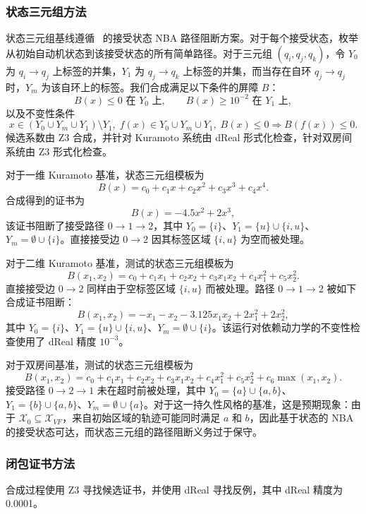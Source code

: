 \subsubsection{状态三元组方法}
状态三元组基线遵循~\cite{wongpiromsarn2015automata} 的接受状态 NBA 路径阻断方案。对于每个接受状态，枚举从初始自动机状态到该接受状态的所有简单路径。对于三元组 $(q_i,q_j,q_k)$，令 $Y_0$ 为 $q_i\rightarrow q_j$ 上标签的并集，$Y_1$ 为 $q_j\rightarrow q_k$ 上标签的并集，而当存在自环 $q_j\rightarrow q_j$ 时，$Y_m$ 为该自环上的标签。我们合成满足以下条件的屏障 $B$：
\[
B(x)\le 0 \text{ 在 } Y_0\text{ 上},\qquad
B(x)\ge 10^{-2} \text{ 在 } Y_1\text{ 上},
\]
以及不变性条件
\[
x\in (Y_0\cup Y_m\cup Y_1)\setminus Y_1,\; f(x)\in Y_0\cup Y_m\cup Y_1,\; B(x)\le 0
\Rightarrow B(f(x))\le 0.
\]
候选系数由 Z3 合成，并针对 Kuramoto 系统由 dReal 形式化检查，针对双房间系统由 Z3 形式化检查。

对于一维 Kuramoto 基准，状态三元组模板为
\[
B(x)=c_0+c_1x+c_2x^2+c_3x^3+c_4x^4.
\]
合成得到的证书为
\[
B(x)=-4.5x^2+2x^3,
\]
该证书阻断了接受路径 $0\rightarrow1\rightarrow2$，其中 $Y_0=\{i\}$、$Y_1=\{u\}\cup\{i,u\}$、$Y_m=\emptyset\cup\{i\}$。直接接受边 $0\rightarrow2$ 因其标签区域 $\{i,u\}$ 为空而被处理。

对于二维 Kuramoto 基准，测试的状态三元组模板为
\[
B(x_1,x_2)=c_0+c_1x_1+c_2x_2+c_3x_1x_2+c_4x_1^2+c_5x_2^2.
\]
直接接受边 $0\rightarrow2$ 同样由于空标签区域 $\{i,u\}$ 而被处理。路径 $0\rightarrow1\rightarrow2$ 被如下合成证书阻断：
\[
B(x_1,x_2)=-x_1-x_2-3.125x_1x_2+2x_1^2+2x_2^2,
\]
其中 $Y_0=\{i\}$、$Y_1=\{u\}\cup\{i,u\}$、$Y_m=\emptyset\cup\{i\}$。该运行对依赖动力学的不变性检查使用了 dReal 精度 $10^{-3}$。

对于双房间基准，测试的状态三元组模板为
\[
B(x_1,x_2)=c_0+c_1x_1+c_2x_2+c_3x_1x_2+c_4x_1^2+c_5x_2^2+c_6\max(x_1,x_2).
\]
接受路径 $0\rightarrow2\rightarrow1$ 未在超时前被处理，其中 $Y_0=\{a\}\cup\{a,b\}$、$Y_1=\{b\}\cup\{a,b\}$、$Y_m=\emptyset\cup\{a\}$。对于这一持久性风格的基准，这是预期现象：由于 $\mathcal{X}_0\subseteq \mathcal{X}_{VF}$，来自初始区域的轨迹可能同时满足 $a$ 和 $b$，因此基于状态的 NBA 的接受状态可达，而状态三元组的路径阻断义务过于保守。

\subsubsection{闭包证书方法}
合成过程使用 Z3 寻找候选证书，并使用 dReal 寻找反例，其中 dReal 精度为 0.0001。

